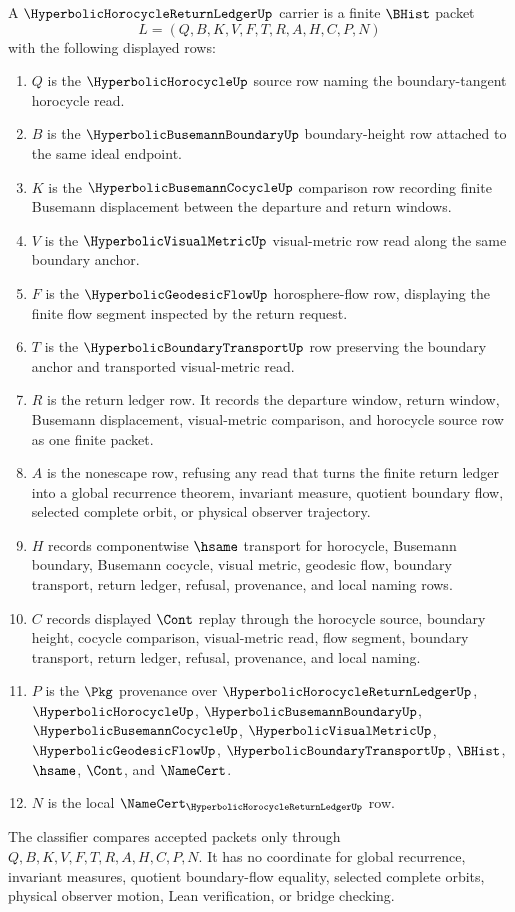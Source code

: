 \begin{definition}
\label{def:hyperbolic-horocycle-return-ledger-carrier}
A $\HyperbolicHorocycleReturnLedgerUp$ carrier is a finite $\BHist$ packet
$$
L=(Q,B,K,V,F,T,R,A,H,C,P,N)
$$
with the following displayed rows:
\begin{enumerate}
\item $Q$ is the $\HyperbolicHorocycleUp$ source row naming the boundary-tangent horocycle read.
\item $B$ is the $\HyperbolicBusemannBoundaryUp$ boundary-height row attached to the same ideal endpoint.
\item $K$ is the $\HyperbolicBusemannCocycleUp$ comparison row recording finite Busemann displacement between the departure and return windows.
\item $V$ is the $\HyperbolicVisualMetricUp$ visual-metric row read along the same boundary anchor.
\item $F$ is the $\HyperbolicGeodesicFlowUp$ horosphere-flow row, displaying the finite flow segment inspected by the return request.
\item $T$ is the $\HyperbolicBoundaryTransportUp$ row preserving the boundary anchor and transported visual-metric read.
\item $R$ is the return ledger row. It records the departure window, return window, Busemann displacement, visual-metric comparison, and horocycle source row as one finite packet.
\item $A$ is the nonescape row, refusing any read that turns the finite return ledger into a global recurrence theorem, invariant measure, quotient boundary flow, selected complete orbit, or physical observer trajectory.
\item $H$ records componentwise $\hsame$ transport for horocycle, Busemann boundary, Busemann cocycle, visual metric, geodesic flow, boundary transport, return ledger, refusal, provenance, and local naming rows.
\item $C$ records displayed $\Cont$ replay through the horocycle source, boundary height, cocycle comparison, visual-metric read, flow segment, boundary transport, return ledger, refusal, provenance, and local naming.
\item $P$ is the $\Pkg$ provenance over $\HyperbolicHorocycleReturnLedgerUp$, $\HyperbolicHorocycleUp$, $\HyperbolicBusemannBoundaryUp$, $\HyperbolicBusemannCocycleUp$, $\HyperbolicVisualMetricUp$, $\HyperbolicGeodesicFlowUp$, $\HyperbolicBoundaryTransportUp$, $\BHist$, $\hsame$, $\Cont$, and $\NameCert$.
\item $N$ is the local $\NameCert_{\HyperbolicHorocycleReturnLedgerUp}$ row.
\end{enumerate}
The classifier compares accepted packets only through $Q,B,K,V,F,T,R,A,H,C,P,N$. It has no coordinate for global recurrence, invariant measures, quotient boundary-flow equality, selected complete orbits, physical observer motion, Lean verification, or bridge checking.
\end{definition}

